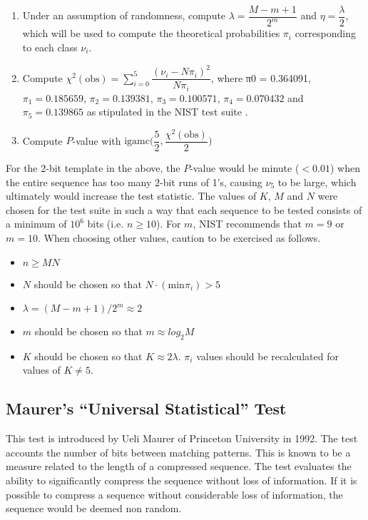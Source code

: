 \begin{enumerate}
    \item Under an assumption of randomness, compute $\lambda = \dfrac{M-m+1}{2^m}$ and $\eta = \dfrac{\lambda}{2}$, which will be used to compute the theoretical probabilities $\pi_i$ corresponding to each class $\nu_i$.
    
    \item Compute $\chi^2(\text{obs}) = \sum_{i=0}^{5} \dfrac{(\nu_i - N\pi_i)^2}{N\pi_i}$, where π0 = 0.364091, $\pi_1 = 0.185659$, $\pi_2 = 0.139381$, $\pi_3 = 0.100571$, $\pi_4 = 0.070432$ and $\pi_5 = 0.139865$ as stipulated in the NIST test suite \cite{rep_nist_sp_80022}.
    
    \item Compute $P$-value with $\text{igamc}\bigg(\dfrac{5}{2}, \dfrac{\chi^2(\text{obs})}{2}\bigg)$
\end{enumerate}

For the $2$-bit template in the above, the $P$-value would be minute ($< 0.01$) when the entire sequence has too many $2$-bit runs of 1's, causing $\nu_5$ to be large, which ultimately would increase the test statistic. The values of $K$, $M$ and $N$ were chosen for the test suite in such a way that each sequence to be tested consists of a minimum of $10^6$ bits (i.e. $n \geq 10$). For $m$, NIST recommends that $m = 9$ or $m = 10$. When choosing other values, caution to be exercised as follows.

\begin{itemize}
    \item $n \geq MN$
    \item $N$ should be chosen so that $N \cdot (\text{min} \pi_i) > 5$
    \item $\lambda = (M-m+1)/2^m \approx 2$
    \item $m$ should be chosen so that $m \approx log_2 M$
    \item $K$ should be chosen so that $K \approx 2λ$. $\pi_i$ values should be recalculated for values of $K \neq 5$. 
\end{itemize}

\subsection{Maurer’s “Universal Statistical” Test}

This test is introduced by Ueli Maurer of Princeton University in 1992. The test accounts the number of bits between matching patterns. This is known to be a measure related to the length of a compressed sequence. The test evaluates the ability to significantly compress the sequence without loss of information. If it is possible to compress a sequence without considerable loss of information, the sequence would be deemed non random.

